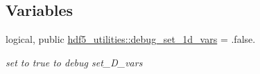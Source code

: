 \subsection*{Variables}
\begin{DoxyCompactItemize}
\item 
logical, public \hyperlink{namespacehdf5__utilities_addf084b90450dc2a0cc614f2f5ac13fc}{hdf5\+\_\+utilities\+::debug\+\_\+set\+\_\+1d\+\_\+vars} = .false.
\begin{DoxyCompactList}\small\item\em set to true to debug set\+\_\+D\+\_\+vars \end{DoxyCompactList}\end{DoxyCompactItemize}
